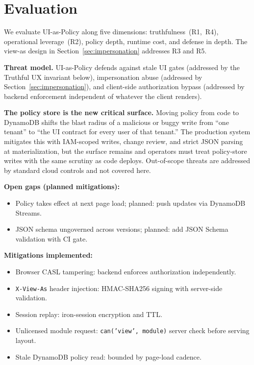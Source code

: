 \documentclass[10pt,journal]{IEEEtran}
\newcommand{\uiPolicy}{UI-as-Policy}
\newcommand{\viewas}{view-as}
\newcommand{\code}[1]{{\small\textcolor{CausifyBlue}{\texttt{#1}}}}
\begin{document}
\section{Evaluation}
\label{sec:eval}

We evaluate \uiPolicy{} along five dimensions: truthfulness~(R1,~R4),
operational leverage~(R2), policy depth, runtime cost, and defense in
depth. The \viewas{} design in Section~\ref{sec:impersonation} addresses R3 and R5.

\noindent\textbf{Threat model.} \uiPolicy{} defends against stale UI gates (addressed
by the Truthful UX invariant below), impersonation abuse (addressed by
Section~\ref{sec:impersonation}), and client-side authorization bypass (addressed by backend
enforcement independent of whatever the client renders).

\noindent\textbf{The policy store is the new critical surface.} Moving policy from
code to DynamoDB shifts the blast radius of a malicious or buggy write from
``one tenant'' to ``the UI contract for every user of that tenant.''
The production system mitigates this with IAM-scoped writes, change review,
and strict JSON parsing at materialization, but the surface remains and
operators must treat policy-store writes with the same scrutiny as code
deploys. Out-of-scope threats are addressed by standard cloud controls and
not covered here.

\noindent\textbf{Open gaps (planned mitigations):}
\begin{itemize}[label=\textbullet, leftmargin=2em, topsep=2pt, itemsep=1pt, parsep=0pt, partopsep=0pt]
  \item Policy takes effect at next page load; planned: push updates via DynamoDB Streams.
  \item JSON schema ungoverned across versions; planned: add JSON Schema validation with CI gate.
\end{itemize}

\noindent\textbf{Mitigations implemented:}
\begin{itemize}[label=\textbullet, leftmargin=2em, topsep=2pt, itemsep=1pt, parsep=0pt, partopsep=0pt]
  \item Browser CASL tampering: backend enforces authorization independently.
  \item \code{X-View-As} header injection: HMAC-SHA256 signing with server-side validation.
  \item Session replay: iron-session encryption and TTL.
  \item Unlicensed module request: \code{can('view',\,module)} server check before serving layout.
  \item Stale DynamoDB policy read: bounded by page-load cadence.
\end{itemize}
\end{document}
